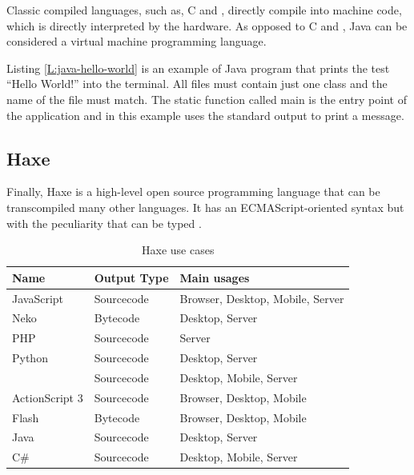 Classic compiled languages, such as, C and \CC, directly compile into machine
code, which is directly interpreted by the hardware. As opposed to C and \CC,
Java can be considered a virtual machine programming language.

\begin{codefigure}
\end{codefigure}

Listing \ref{L:java-hello-world} is an example of Java program that prints the
test “Hello World!” into the terminal. All files must contain just one class and
the name of the file must match. The static function called main is the entry
point of the application and in this example uses the standard output to print
a message.

\subsection{Haxe}

Finally, Haxe is a high-level open source programming language that can be 
transcompiled many other languages. It has an ECMAScript-oriented syntax but 
with the peculiarity that can be typed \cite{what-is-haxe}. 

\begin{table}[htb]
\begin{center}
\begin{tabular}{|l|l|l|}
\hline
{\bf Name }		& {\bf Output Type} & {\bf Main usages}  \\ \hline \hline
JavaScript		& Sourcecode		& Browser, Desktop, Mobile, Server \\ \hline
Neko			& Bytecode			& Desktop, Server   \\ \hline
PHP				& Sourcecode		& Server   \\ \hline
Python			& Sourcecode		& Desktop, Server   \\ \hline
\CC				& Sourcecode		& Desktop, Mobile, Server   \\ \hline
ActionScript 3	& Sourcecode		& Browser, Desktop, Mobile   \\ \hline
Flash			& Bytecode			& Browser, Desktop, Mobile   \\ \hline
Java			& Sourcecode		& Desktop, Server   \\ \hline
C\#				& Sourcecode		& Desktop, Mobile, Server   \\ \hline
\end{tabular}
\caption{Haxe use cases \cite{what-is-haxe}}
\label{T:haxe-use-cases}
\end{center}
\end{table}

